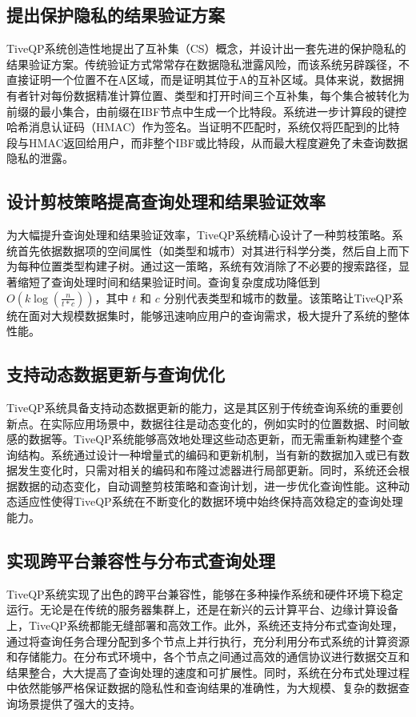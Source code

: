 \documentclass{cumcmthesis}
\numberwithin{equation}{section} %
\numberwithin{figure}{section} %
\numberwithin{table}{section} %
\begin{document}
\subsection{提出保护隐私的结果验证方案}
TiveQP系统创造性地提出了互补集（CS）概念，并设计出一套先进的保护隐私的结果验证方案。传统验证方式常常存在数据隐私泄露风险，而该系统另辟蹊径，不直接证明一个位置不在A区域，而是证明其位于A的互补区域。具体来说，数据拥有者针对每份数据精准计算位置、类型和打开时间三个互补集，每个集合被转化为前缀的最小集合，由前缀在IBF节点中生成一个比特段。系统进一步计算段的键控哈希消息认证码（HMAC）作为签名。当证明不匹配时，系统仅将匹配到的比特段与HMAC返回给用户，而非整个IBF或比特段，从而最大程度避免了未查询数据隐私的泄露。

\subsection{设计剪枝策略提高查询处理和结果验证效率}
为大幅提升查询处理和结果验证效率，TiveQP系统精心设计了一种剪枝策略。系统首先依据数据项的空间属性（如类型和城市）对其进行科学分类，然后自上而下为每种位置类型构建子树。通过这一策略，系统有效消除了不必要的搜索路径，显著缩短了查询处理时间和结果验证时间。查询复杂度成功降低到 \(O(k\log(\frac{n}{t*c}))\)，其中 \(t\) 和 \(c\) 分别代表类型和城市的数量。该策略让TiveQP系统在面对大规模数据集时，能够迅速响应用户的查询需求，极大提升了系统的整体性能。

\subsection{支持动态数据更新与查询优化}
TiveQP系统具备支持动态数据更新的能力，这是其区别于传统查询系统的重要创新点。在实际应用场景中，数据往往是动态变化的，例如实时的位置数据、时间敏感的数据等。TiveQP系统能够高效地处理这些动态更新，而无需重新构建整个查询结构。系统通过设计一种增量式的编码和更新机制，当有新的数据加入或已有数据发生变化时，只需对相关的编码和布隆过滤器进行局部更新。同时，系统还会根据数据的动态变化，自动调整剪枝策略和查询计划，进一步优化查询性能。这种动态适应性使得TiveQP系统在不断变化的数据环境中始终保持高效稳定的查询处理能力。

\subsection{实现跨平台兼容性与分布式查询处理}
TiveQP系统实现了出色的跨平台兼容性，能够在多种操作系统和硬件环境下稳定运行。无论是在传统的服务器集群上，还是在新兴的云计算平台、边缘计算设备上，TiveQP系统都能无缝部署和高效工作。此外，系统还支持分布式查询处理，通过将查询任务合理分配到多个节点上并行执行，充分利用分布式系统的计算资源和存储能力。在分布式环境中，各个节点之间通过高效的通信协议进行数据交互和结果整合，大大提高了查询处理的速度和可扩展性。同时，系统在分布式处理过程中依然能够严格保证数据的隐私性和查询结果的准确性，为大规模、复杂的数据查询场景提供了强大的支持。
\end{document}

